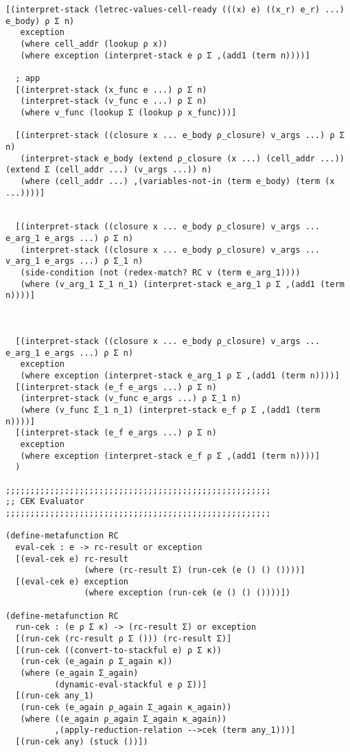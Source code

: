 \begin{lstlisting}[language=pltredex,
                basicstyle=\ttfamily\scriptsize,
                numbers=none, xleftmargin=2em]
  [(interpret-stack (letrec-values-cell-ready (((x) e) ((x_r) e_r) ...) e_body) ρ Σ n)
   exception
   (where cell_addr (lookup ρ x))
   (where exception (interpret-stack e ρ Σ ,(add1 (term n))))]

  ; app
  [(interpret-stack (x_func e ...) ρ Σ n)
   (interpret-stack (v_func e ...) ρ Σ n)
   (where v_func (lookup Σ (lookup ρ x_func)))]

  [(interpret-stack ((closure x ... e_body ρ_closure) v_args ...) ρ Σ n)
   (interpret-stack e_body (extend ρ_closure (x ...) (cell_addr ...)) (extend Σ (cell_addr ...) (v_args ...)) n)
   (where (cell_addr ...) ,(variables-not-in (term e_body) (term (x ...))))]


  [(interpret-stack ((closure x ... e_body ρ_closure) v_args ... e_arg_1 e_args ...) ρ Σ n)
   (interpret-stack ((closure x ... e_body ρ_closure) v_args ... v_arg_1 e_args ...) ρ Σ_1 n)
   (side-condition (not (redex-match? RC v (term e_arg_1))))
   (where (v_arg_1 Σ_1 n_1) (interpret-stack e_arg_1 ρ Σ ,(add1 (term n))))]



  [(interpret-stack ((closure x ... e_body ρ_closure) v_args ... e_arg_1 e_args ...) ρ Σ n)
   exception
   (where exception (interpret-stack e_arg_1 ρ Σ ,(add1 (term n))))]
  [(interpret-stack (e_f e_args ...) ρ Σ n)
   (interpret-stack (v_func e_args ...) ρ Σ_1 n)
   (where (v_func Σ_1 n_1) (interpret-stack e_f ρ Σ ,(add1 (term n))))]
  [(interpret-stack (e_f e_args ...) ρ Σ n)
   exception
   (where exception (interpret-stack e_f ρ Σ ,(add1 (term n))))]
  )

;;;;;;;;;;;;;;;;;;;;;;;;;;;;;;;;;;;;;;;;;;;;;;;;;;;;;;
;; CEK Evaluator
;;;;;;;;;;;;;;;;;;;;;;;;;;;;;;;;;;;;;;;;;;;;;;;;;;;;;;

(define-metafunction RC
  eval-cek : e -> rc-result or exception
  [(eval-cek e) rc-result
                (where (rc-result Σ) (run-cek (e () () ())))]
  [(eval-cek e) exception
                (where exception (run-cek (e () () ())))])

(define-metafunction RC
  run-cek : (e ρ Σ κ) -> (rc-result Σ) or exception
  [(run-cek (rc-result ρ Σ ())) (rc-result Σ)]
  [(run-cek ((convert-to-stackful e) ρ Σ κ))
   (run-cek (e_again ρ Σ_again κ))
   (where (e_again Σ_again)
          (dynamic-eval-stackful e ρ Σ))]
  [(run-cek any_1)
   (run-cek (e_again ρ_again Σ_again κ_again))
   (where ((e_again ρ_again Σ_again κ_again))
          ,(apply-reduction-relation -->cek (term any_1)))]
  [(run-cek any) (stuck ())])


\end{lstlisting}